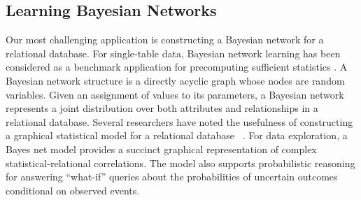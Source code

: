 \documentclass{acm_proc_article-sp}
\begin{document}
%



%
%
%

\subsection{Learning Bayesian Networks}

Our most challenging application is constructing a Bayesian network for a relational database. For single-table data, Bayesian network learning has been considered as a benchmark application for precomputing sufficient statistics \cite{Moore1998,lv2012}. A Bayesian network structure is a directly acyclic graph whose nodes are random variables. Given an assignment of values to its parameters, a Bayesian network represents a joint distribution over both attributes and relationships in a relational database. Several researchers have noted the usefulness of constructing a graphical statistical model for a relational database ~\cite{Graepel_CIKM13,Wang2008}.
For data exploration, a Bayes net  model provides a succinct graphical representation of complex statistical-relational correlations. The model also supports probabilistic reasoning for answering ``what-if'' queries about the probabilities of uncertain outcomes conditional on observed events. 
\end{document}
